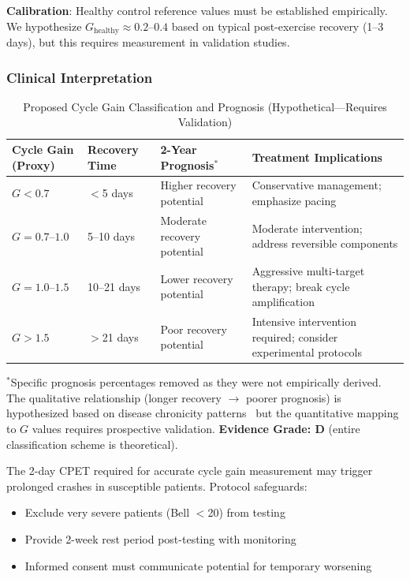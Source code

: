 \textbf{Calibration}: Healthy control reference values must be established empirically. We hypothesize $G_{\text{healthy}} \approx 0.2$--$0.4$ based on typical post-exercise recovery (1--3 days), but this requires measurement in validation studies.

\subsubsection{Clinical Interpretation}

\begin{table}[htbp]
\centering
\caption{Proposed Cycle Gain Classification and Prognosis (Hypothetical---Requires Validation)}
\label{tab:cycle-gain-prognosis}
\begin{tabular}{p{2.5cm}p{3cm}p{3cm}p{4cm}}
\toprule
\textbf{Cycle Gain (Proxy)} & \textbf{Recovery Time} & \textbf{2-Year Prognosis$^*$} & \textbf{Treatment Implications} \\
\midrule
$G < 0.7$ & $<$5 days & Higher recovery potential & Conservative management; emphasize pacing \\
\addlinespace
$G = 0.7$--$1.0$ & 5--10 days & Moderate recovery potential & Moderate intervention; address reversible components \\
\addlinespace
$G = 1.0$--$1.5$ & 10--21 days & Lower recovery potential & Aggressive multi-target therapy; break cycle amplification \\
\addlinespace
$G > 1.5$ & $>$21 days & Poor recovery potential & Intensive intervention required; consider experimental protocols \\
\bottomrule
\end{tabular}

\smallskip
\footnotesize{$^*$Specific prognosis percentages removed as they were not empirically derived. The qualitative relationship (longer recovery $\rightarrow$ poorer prognosis) is hypothesized based on disease chronicity patterns~\cite{Cairns2005prognosis} but the quantitative mapping to $G$ values requires prospective validation. \textbf{Evidence Grade: D} (entire classification scheme is theoretical).}
\end{table}

\begin{warning}
The 2-day CPET required for accurate cycle gain measurement may trigger prolonged crashes in susceptible patients. Protocol safeguards:
\begin{itemize}
    \item Exclude very severe patients (Bell $<$20) from testing
    \item Provide 2-week rest period post-testing with monitoring
    \item Informed consent must communicate potential for temporary worsening
\end{itemize}
\end{warning}

